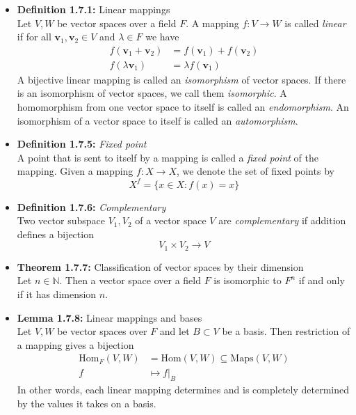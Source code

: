 \documentclass[11pt,a4paper]{article}
\begin{document}
\begin{itemize}

    \item \textbf{Definition 1.7.1:} Linear mappings \\
        Let $V,W$ be vector spaces over a field $F$.
        A mapping $f: V \to W$ is called \emph{linear}
        if for all $\textbf{v}_1, \textbf{v}_2 \in V$ and $\lambda \in F$ we have
        \begin{align*}{}
            f(\textbf{v}_1 + \textbf{v}_2) & = f(\textbf{v}_1) + f(\textbf{v}_2) \\
            f(\lambda\textbf{v}_1)         & = \lambda f(\textbf{v}_1)
        \end{align*}
        A bijective linear mapping is called an \emph{isomorphism} of vector spaces.
        If there is an isomorphism of vector spaces, we call them \emph{isomorphic}.
        A homomorphism from one vector space to itself is called an \emph{endomorphism}.
        An isomorphism of a vector space to itself is called an \emph{automorphism}.

    \item \textbf{Definition 1.7.5:} \emph{Fixed point} \\
        A point that is sent to itself by a mapping is called a \emph{fixed point} of the mapping.
        Given a mapping $f: X \to X$, we denote the set of fixed points by
        \[
            X^f = \{x \in X : f(x) = x\}
        \]

    \item \textbf{Definition 1.7.6:} \emph{Complementary} \\
        Two vector subspace $V_1, V_2$ of a vector space $V$ are \emph{complementary} if addition
        defines a bijection
        \[
            V_1 \times V_2 \to V
        \]

    \item \textbf{Theorem 1.7.7:} Classification of vector spaces by their dimension \\
        Let $n \in \mathbb{N}$.
        Then a vector space over a field $F$ is isomorphic to $F^n$ if and only if it has
        dimension $n$.

    \item \textbf{Lemma 1.7.8:} Linear mappings and bases \\
        Let $V,W$ be vector spaces over $F$ and let $B \subset V$ be a basis.
        Then restriction of a mapping gives a bijection
        \begin{align*}{}
            \text{Hom}_F(V,W) & = \text{Hom}(V,W) \subseteq \text{Maps}(V,W) \\
            f                 & \mapsto f|_B
        \end{align*}
        In other words, each linear mapping determines and is completely determined by the values
        it takes on a basis.


\end{itemize}
\end{document}
